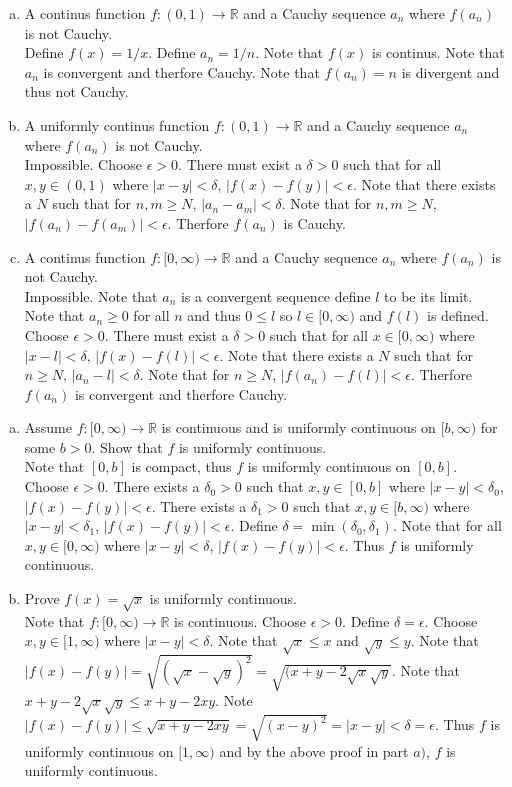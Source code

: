 \documentclass[12pt]{article}
\makeatletter
\theoremstyle{homework}
\newenvironment{exercise}[1]
{\def\@currentlabel{#1}\exercisecore}
{\endexercisecore}
\makeatother
\begin{document}
\begin{enumerate}[(a)]
\item
A continus function $f:(0,1)\rightarrow \mathbb{R}$ and a Cauchy sequence $a_n$ where $f(a_n)$ is not Cauchy.\\
Define $f(x)=1/x$. Define $a_n=1/n$.  Note that $f(x)$ is continus.  Note that $a_n$ is convergent and therfore Cauchy.  Note that $f(a_n)=n$ is divergent and thus not Cauchy.
\item
A uniformly continus function $f:(0,1)\rightarrow \mathbb{R}$ and a Cauchy sequence $a_n$ where $f(a_n)$ is not Cauchy.\\
Impossible.  Choose $\epsilon>0$.  There must exist a $\delta>0$ such that for all $x,y\in (0,1)$ where $|x-y|<\delta$, $|f(x)-f(y)|<\epsilon$.  Note that there exists a $N$ such that for $n,m\geq N$, $|a_n-a_m|<\delta$.  Note that for $n,m\geq N$, $|f(a_n)-f(a_m)|<\epsilon$.  Therfore $f(a_n)$ is Cauchy.
\item
A continus function $f:[0,\infty)\rightarrow \mathbb{R}$ and a Cauchy sequence $a_n$ where $f(a_n)$ is not Cauchy.\\
Impossible.  Note that $a_n$ is a convergent sequence define $l$ to be its limit.  Note that $a_n\geq 0$ for all $n$ and thus $0\leq l$ so $l\in [0,\infty)$ and $f(l)$ is defined.  Choose $\epsilon>0$.  There must exist a $\delta>0$ such that for all $x\in [0,\infty)$ where $|x-l|<\delta$, $|f(x)-f(l)|<\epsilon$.  Note that there exists a $N$ such that for $n\geq N$, $|a_n-l|<\delta$.  Note that for $n\geq N$, $|f(a_n)-f(l)|<\epsilon$.  Therfore $f(a_n)$ is convergent and therfore Cauchy.
\end{enumerate}
\begin{exercise}

5
\end{exercise}
\begin{enumerate}[a)]
\item
Assume $f : [0, \infty) \rightarrow \mathbb{R}$ is continuous and is uniformly continuous on $[b, \infty)$ for
some $b > 0$. Show that $f$ is uniformly continuous.\\
Note that $[0,b]$ is compact, thus $f$ is uniformly continuous on $[0,b]$.  Choose $\epsilon>0$.  There exists a $\delta_0 >0$ such that $x,y\in [0,b]$ where $|x-y|<\delta_0$, $|f(x)-f(y)|<\epsilon$.  There exists a $\delta_1 >0$ such that $x,y\in [b, \infty)$ where $|x-y|<\delta_1$, $|f(x)-f(y)|<\epsilon$.  Define $\delta=\min(\delta_0,\delta_1)$.  Note that for all $x,y\in [0,\infty)$ where $|x-y|<\delta$, $|f(x)-f(y)|<\epsilon$.  Thus $f$ is uniformly continuous.
\item
Prove $f(x)=\sqrt{x}$ is uniformly continuous.\\
Note that $f:[0,\infty)\rightarrow \mathbb{R}$ is continuous.  Choose $\epsilon>0$.  Define $\delta=\epsilon$.  Choose $x,y\in [1,\infty)$ where $|x-y|<\delta$.  Note that $\sqrt{x}\leq x$ and $\sqrt{y}\leq y$.  Note that $|f(x)-f(y)|=\sqrt{(\sqrt{x}-\sqrt{y})^2}=\sqrt{(x+y-2\sqrt{x}\sqrt{y}}$.  Note that $x+y-2\sqrt{x}\sqrt{y}\leq x+y-2xy$.  Note $|f(x)-f(y)|\leq \sqrt{x+y-2xy}=\sqrt{(x-y)^2}=|x-y|<\delta=\epsilon$.  Thus $f$ is uniformly continuous on $[1,\infty)$ and by the above proof in part $a)$, $f$ is uniformly continuous.
\end{enumerate}
\end{document}
